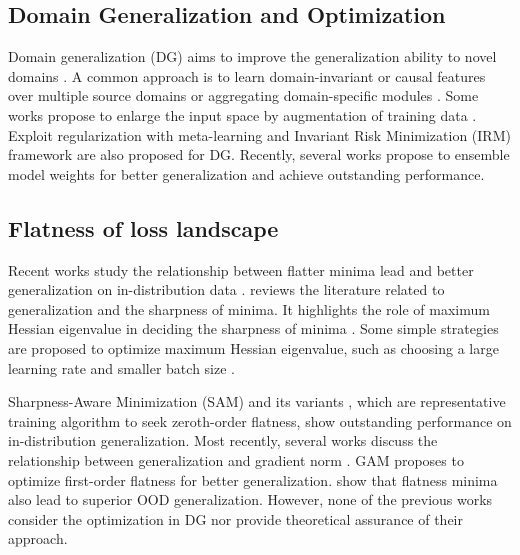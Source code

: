 \subsection{Domain Generalization and Optimization}
Domain generalization (DG) aims to improve the generalization ability to novel domains \cite{ghifary2015domain,khosla2012undoing,koh2021wilds}. 
A common approach is to learn domain-invariant or causal features over multiple source domains \cite{dou2019domain,hu2020domain,li2018learning, li2018domain, motiian2017unified, piratla2020efficient, seo2019learning, zhang2021deep,xu2021stable,zhang2022towards,wang2022causal,zhang2023free}
or aggregating domain-specific modules \cite{mancini2018best, mancini2018robust}. 
Some works propose to enlarge the input space by augmentation of training data \cite{carlucci2019domain, volpi2018generalizing, qiao2020learning, shankar2018generalizing, zhou2020deep, zhou2020learning, Xu2021AFF}. 
Exploit regularization with meta-learning \cite{dou2019domain, li2019episodic} and Invariant Risk Minimization (IRM) framework \cite{arjovsky2019invariant} are also proposed for DG.
Recently, several works propose to ensemble model weights for better generalization \cite{cha2021swad,arpit2021ensemble,rame2022recycling, wortsman2022model,rame2022diverse,lisimple,chu2022dna} and achieve outstanding performance. 




\subsection{Flatness of loss landscape}


Recent works study the relationship between flatter minima lead and better generalization on in-distribution data \cite{DBLP:conf/iclr/KeskarMNST17,DBLP:conf/iclr/KeskarMNST17,zhuang2022surrogate,jia2020information,petzka2021relative}.
\cite{kaur2022maximum} reviews the literature related to generalization and the sharpness of minima. It highlights the role of maximum Hessian eigenvalue in deciding the sharpness of minima \cite{DBLP:conf/iclr/KeskarMNST17, wen2019empirical}. 
Some simple strategies are proposed to optimize maximum Hessian eigenvalue, such as choosing a large learning rate \cite{lewkowycz2020large, DBLP:conf/iclr/CohenKLKT21, DBLP:conf/iclr/JastrzebskiSFAT20} and smaller batch size \cite{DBLP:conf/iclr/SmithL18, lewkowycz2020large, jastrzkebski2017three}. 
 
Sharpness-Aware Minimization (SAM) \cite{foret2021sharpness} and its variants \cite{zhuang2022surrogate, kwon2021asam, du2021efficient,liu2022towards, du2022sharpness,mi2022make,zhong2022improving,kim2022sharpness,kim2022fisher}, which are representative training algorithm to seek zeroth-order flatness, show outstanding performance on in-distribution generalization. 
Most recently, several works discuss the relationship between generalization and gradient norm \cite{barrett2020implicit,zhao2022penalizing}. GAM\cite{Zhang2023GradientNA} proposes to optimize first-order flatness for better generalization. \cite{cha2021swad, rangwani2022closer} show that flatness minima also lead to superior OOD generalization. However, none of the previous works consider the optimization in DG nor provide theoretical assurance of their approach. 
